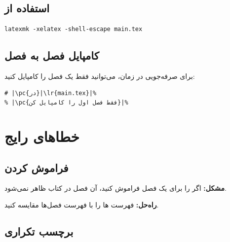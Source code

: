 
\subsection{استفاده از }
\label{sec:large-projects-compile-latexmk}

\begin{latin}
\begin{verbatim}
latexmk -xelatex -shell-escape main.tex
\end{verbatim}
\end{latin}


\subsection{کامپایل فصل به فصل}
\label{sec:large-projects-compile-chapter}

برای صرفه‌جویی در زمان، می‌توانید فقط
یک فصل را کامپایل کنید:

\begin{latin}
\begin{verbatim}
# |\pc{در}|\lr{main.tex}|%
% |\pc{فقط فصل اول را کامپایل کن}|%

\end{verbatim}
\end{latin}


\section{خطاهای رایج}
\label{sec:large-projects-mistakes}

\subsection{فراموش کردن }
\label{sec:large-projects-mistake-input}

\textbf{مشکل:} اگر  را برای یک
فصل فراموش کنید، آن فصل در کتاب ظاهر
نمی‌شود.

\textbf{راه‌حل:} فهرست ها را
با فهرست فصل‌ها مقایسه کنید.

\subsection{برچسب تکراری}
\label{sec:large-projects-mistake-duplicate}

